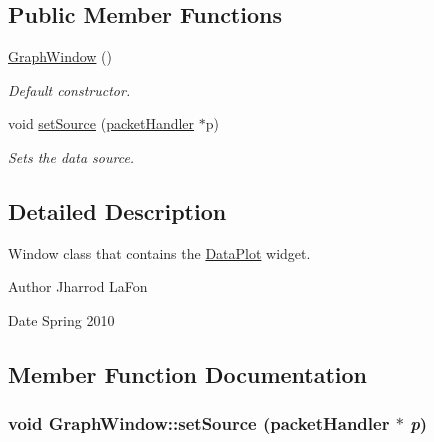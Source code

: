 \subsection*{Public Member Functions}
\begin{DoxyCompactItemize}
\item 
\hypertarget{classGraphWindow_ab8ca84cf6fe5a68e7fb87b7f47636d7d}{
\hyperlink{classGraphWindow_ab8ca84cf6fe5a68e7fb87b7f47636d7d}{GraphWindow} ()}
\label{classGraphWindow_ab8ca84cf6fe5a68e7fb87b7f47636d7d}

\begin{DoxyCompactList}\small\item\em Default constructor. \item\end{DoxyCompactList}\item 
void \hyperlink{classGraphWindow_a07a46e21184c287ba49db8145047e420}{setSource} (\hyperlink{classpacketHandler}{packetHandler} $\ast$p)
\begin{DoxyCompactList}\small\item\em Sets the data source. \item\end{DoxyCompactList}\end{DoxyCompactItemize}


\subsection{Detailed Description}
Window class that contains the \hyperlink{classDataPlot}{DataPlot} widget. \begin{DoxyAuthor}{Author}
Jharrod LaFon 
\end{DoxyAuthor}
\begin{DoxyDate}{Date}
Spring 2010 
\end{DoxyDate}


\subsection{Member Function Documentation}
\hypertarget{classGraphWindow_a07a46e21184c287ba49db8145047e420}{
\subsubsection[{setSource}]{\setlength{\rightskip}{0pt plus 5cm}void GraphWindow::setSource ({\bf packetHandler} $\ast$ {\em p})}}
\label{classGraphWindow_a07a46e21184c287ba49db8145047e420}


